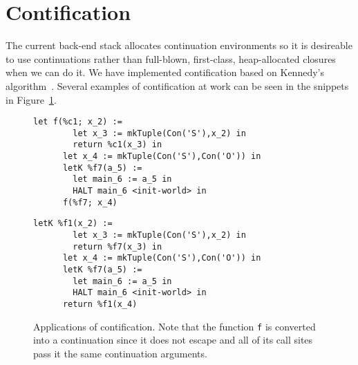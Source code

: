 \documentclass{article}
\begin{document}
\section{Contification}
\label{sec:contification}
The current back-end stack allocates continuation environments so it is desireable to use continuations rather than full-blown, first-class, heap-allocated closures when we can do it. We have implemented contification based on Kennedy's algorithm~\cite{kennedy07cps}. Several examples of contification at work can be seen in the snippets in Figure~\ref{fig:contification}.
\begin{figure}[htb]
\centering
\begin{minipage}{0.4\textwidth}
   \begin{lstlisting}[gobble=6,caption={Before contification}]
      let f(%c1; x_2) := 
        let x_3 := mkTuple(Con('S'),x_2) in
        return %c1(x_3) in
      let x_4 := mkTuple(Con('S'),Con('O')) in
      letK %f7(a_5) := 
        let main_6 := a_5 in
        HALT main_6 <init-world> in
      f(%f7; x_4)
    \end{lstlisting}
\end{minipage}
\begin{minipage}{0.1\textwidth}
\end{minipage}
\begin{minipage}{0.4\textwidth}
    \begin{lstlisting}[gobble=6,caption={After contification}]
      letK %f1(x_2) := 
        let x_3 := mkTuple(Con('S'),x_2) in
        return %f7(x_3) in
      let x_4 := mkTuple(Con('S'),Con('O')) in
      letK %f7(a_5) := 
        let main_6 := a_5 in
        HALT main_6 <init-world> in
      return %f1(x_4)
    \end{lstlisting}
\end{minipage}


\caption{Applications of contification. Note that the function \lstinline!f! is converted into a continuation since it does not escape and all of its call sites pass it the same continuation arguments.}
\label{fig:contification}
\end{figure}
\end{document}

